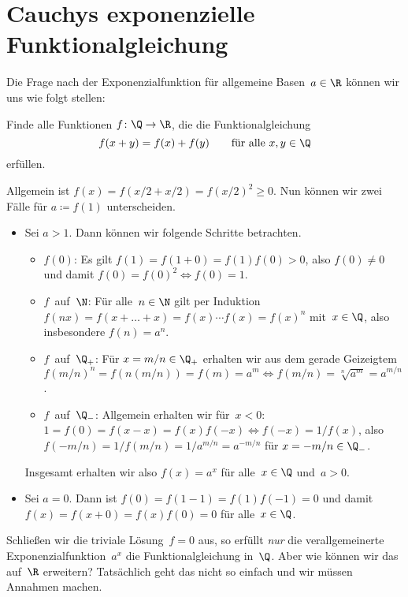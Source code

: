 \documentclass[a4paper]{article}
\begin{document}
\section{Cauchys exponenzielle Funktionalgleichung}

Die Frage nach der Exponenzialfunktion für allgemeine Basen~$a \in \R$ können wir uns wie folgt stellen:

\begin{problem}
    Finde alle Funktionen $f\colon \Q \to \R$, die die Funktionalgleichung
    \begin{equation*}
        f(x+y) = f(x)+f(y) \qquad\text{für alle } x,y \in \Q
    \end{equation*}
    erfüllen.
\end{problem}

\begin{solution}
    Allgemein ist $f(x) = f(x/2+x/2) = f(x/2)^2 \geq 0$. Nun können wir zwei Fälle für $a \coloneqq f(1)$ unterscheiden.
    \begin{itemize}
        \item Sei $a > 1$. Dann können wir folgende Schritte betrachten.
        \begin{itemize}
            \item $f(0)$: Es gilt $f(1) = f(1+0) = f(1)f(0) > 0$, also $f(0) \neq 0$ und damit $f(0) = f(0)^2 \iff f(0) = 1$.
            \item $f$~auf~$\N$: Für alle~$n \in \N$ gilt per Induktion $f(nx) = f(x+\dots+x) = f(x)\cdots f(x) = f(x)^n$ mit~$x \in \Q$, also insbesondere $f(n) = a^n$.
            \item $f$~auf~$\Q_+$: Für $x = m/n \in \Q_+$ erhalten wir aus dem gerade Geizeigtem $f(m/n)^n = f(n(m/n)) = f(m) = a^m \iff f(m/n) = \sqrt[n]{a^m} = a^{m/n}$.
            \item $f$~auf~$\Q_-$: Allgemein erhalten wir für~$x < 0$: $1 = f(0) = f(x-x) = f(x)f(-x) \iff f(-x) = 1/f(x)$, also $f(-m/n) = 1/f(m/n) = 1/a^{m/n} = a^{-m/n}$ für $x = -m/n \in \Q_-$.
        \end{itemize}
        Insgesamt erhalten wir also $f(x) = a^x$ für alle~$x \in \Q$ und~$a > 0$.
        \item Sei $a = 0$. Dann ist $f(0) = f(1-1) = f(1)f(-1) = 0$ und damit $f(x) = f(x+0) = f(x)f(0) = 0$ für alle~$x \in \Q$.
    \end{itemize}
\end{solution}

Schließen wir die triviale Lösung~$f = 0$ aus, so erfüllt \emph{nur} die verallgemeinerte Exponenzialfunktion~$a^x$ die Funktionalgleichung in~$\Q$. Aber wie können wir das auf~$\R$ erweitern? Tatsächlich geht das nicht so einfach und wir müssen Annahmen machen.
\end{document}
